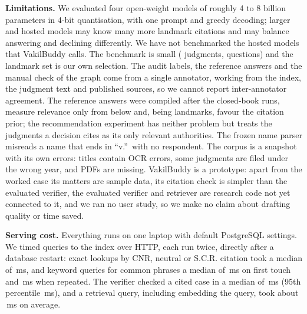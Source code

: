 \documentclass[conference]{IEEEtran}
\begin{document}
\textbf{Limitations.} We evaluated four open-weight models of roughly 4 to 8 billion parameters in 4-bit quantisation, with one prompt and greedy decoding; larger and hosted models may know many more landmark citations and may balance answering and declining differently. We have not benchmarked the hosted models that VakilBuddy calls. The benchmark is small (\NumJudgments{} judgments, \NumTopics{} questions) and the landmark set is our own selection. The audit labels, the reference answers and the manual check of the graph come from a single annotator, working from the index, the judgment text and published sources, so we cannot report inter-annotator agreement. The reference answers were compiled after the closed-book runs, measure relevance only from below and, being landmarks, favour the citation prior; the recommendation experiment has neither problem but treats the judgments a decision cites as its only relevant authorities. The frozen name parser misreads a name that ends in ``v.''\ with no respondent. The corpus is a snapshot with its own errors: titles contain OCR errors, some judgments are filed under the wrong year, and \GraphTextFail{} PDFs are missing. VakilBuddy is a prototype: apart from the worked case its matters are sample data, its citation check is simpler than the evaluated verifier, the evaluated verifier and retriever are research code not yet connected to it, and we ran no user study, so we make no claim about drafting quality or time saved.

\textbf{Serving cost.} Everything runs on one laptop with default PostgreSQL settings. We timed \LatQueries{} queries to the index over HTTP, each run twice, directly after a database restart: exact lookups by CNR, neutral or S.C.R. citation took a median of \LatExactMedian{}\,ms, and keyword queries for common phrases a median of \LatCommonFirstMedian{}\,ms on first touch and \LatCommonWarmMedian{}\,ms when repeated. The verifier checked a cited case in a median of \VerifyMedianMs{}\,ms (95th percentile \VerifyPNinetyFiveMs{}\,ms), and a retrieval query, including embedding the query, took about \QueryMs{}\,ms on average.
\end{document}
